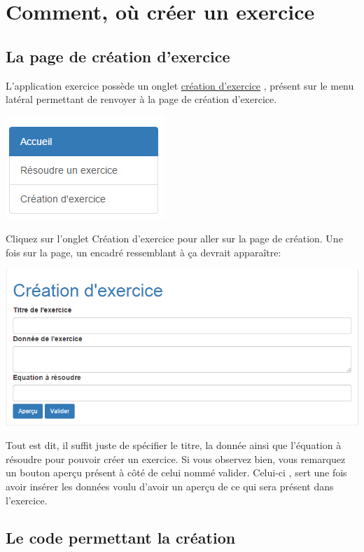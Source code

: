 \documentclass[letterpaper,10pt,english]{sphinxmanual}
\begin{document}
\chapter{Comment, où créer un exercice}
\label{create:comment-ou-creer-un-exercice}\label{create::doc}

\section{La page de création d'exercice}
\label{create:la-page-de-creation-d-exercice}
L'application exercice possède un onglet \href{https://webmath-thirteenfoil8.c9.io/exercises/create/}{création d'exercice} , présent sur le menu latéral permettant de renvoyer à la page de
création d'exercice.

\includegraphics{onglet.png}

Cliquez sur l'onglet Création d'exercice pour aller sur la page de création. Une fois sur la page, un encadré ressemblant à ça devrait apparaître:

\includegraphics{create.png}

Tout est dit, il suffit juste de spécifier le titre, la donnée ainsi que l'équation à résoudre pour pouvoir créer un exercice. Si vous observez bien, vous remarquez un bouton aperçu présent
à côté de celui nommé valider. Celui-ci , sert une fois avoir insérer les données voulu d'avoir un aperçu de ce qui sera présent dans l'exercice.


\section{Le code permettant la création}
\label{create:le-code-permettant-la-creation}
\end{document}
